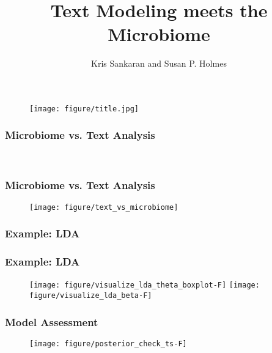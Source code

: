 \documentclass{beamer}
\title{Text Modeling meets the Microbiome}
\author{Kris Sankaran and Susan P. Holmes}
\institute{Department of Statistics, Stanford University}
\begin{document}
\begin{frame}
  \maketitle
\begin{figure}[ht]
  \centering
  \texttt{[image: figure/title.jpg]}
  \caption{\label{fig:label} }
\end{figure}

\end{frame}

\begin{frame}
  \frametitle{Microbiome vs. Text Analysis}
  \begingroup
  \fontsize{10pt}{10pt}\selectfont
  {\ttfamily
  \def\arraystretch{1.2}
  \setlength{\tabcolsep}{0.2em} %
  \begin{table}
     
    \\[12pt]
     
  \end{table}
  }
  \endgroup
\end{frame}

\begin{frame}
  \frametitle{Microbiome vs. Text Analysis}
\begin{figure}[ht]
  \centering
  \texttt{[image: figure/text\_vs\_microbiome]}
  \caption{\label{fig:label} }
\end{figure}

\end{frame}

\begin{frame}
  \frametitle{Example: LDA}
  
\end{frame}

\begin{frame}
  \frametitle{Example: LDA}
 \begin{figure}[ht]
   \centering
   \texttt{[image: figure/visualize\_lda\_theta\_boxplot-F]}
   \texttt{[image: figure/visualize\_lda\_beta-F]}
   \caption{\label{fig:label} }
 \end{figure}
 
\end{frame}


\begin{frame}
  \frametitle{Model Assessment}
  \begin{figure}[!p]
    \centering
    \texttt{[image: figure/posterior\_check\_ts-F]}
  \end{figure} 
\end{frame}
\end{document}
